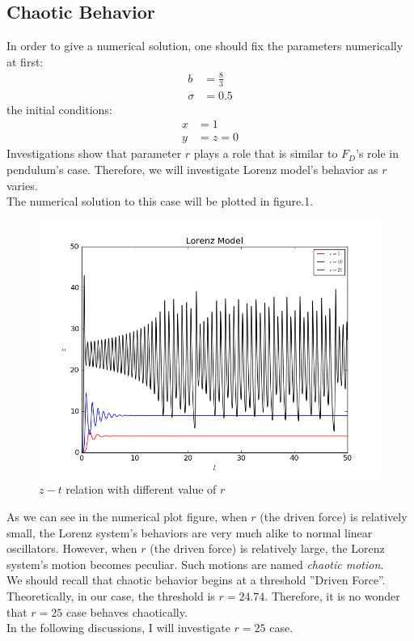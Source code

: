 \documentclass[10pt,a4paper]{article}
\begin{document}
    \subsection{Chaotic Behavior}
    In order to give a numerical solution, one should fix the parameters numerically at first:
    \begin{align}
    b&=\frac{8}{3}\\
    \sigma&=0.5
    \end{align}
    the initial conditions:
    \begin{align}
    x&=1\\
    y&=z=0
    \end{align} 
    Investigations show that parameter $r$ plays a role that is similar to $F_D$'s role in pendulum's case. Therefore, we will investigate Lorenz model's behavior as $r$ varies.\\   
    The numerical solution to this case will be plotted in figure.1.
    \begin{figure}[htbp]
    	\centering
    	\includegraphics[width=5in]{Lorenz_1.png}
    	\caption{$z-t$ relation with different value of $r$}
    \end{figure}
    As we can see in the numerical plot figure, when $r$ (the driven force) is relatively small, the Lorenz system's behaviors are very much alike to normal linear oscillators. However, when $r$ (the driven force) is relatively large, the Lorenz system's motion becomes peculiar. Such motions are named \emph{chaotic motion}.\\
    We should recall that chaotic behavior begins at a threshold ''Driven Force''. Theoretically, in our case, the threshold is $r=24.74$. Therefore, it is no wonder that $r=25$ case behaves chaotically.\\
    In the following discussions, I will investigate $r=25$ case.
    
\end{document}
